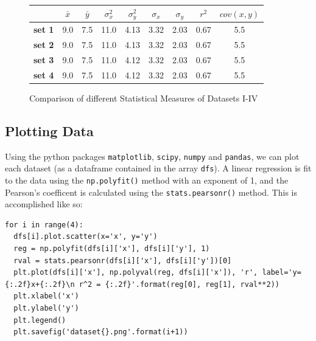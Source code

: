 \documentclass[11pt,a4paper]{article}
\begin{document}
\begin{figure}[]
\centering
\begin{tabular}{l|c|c|c|c|c|c|c|c|}
\cline{2-9}
                                     & \textbf{$\bar{x}$} & \textbf{$\bar{y}$} & \textbf{$\sigma_x^2$} & \textbf{$\sigma_y^2$} & \textbf{$\sigma_x$} & \textbf{$\sigma_y$} & \textbf{$r^2$} & \textbf{$cov(x, y)$} \\ \hline
\multicolumn{1}{|l|}{\textbf{set 1}} & 9.0                & 7.5              & 11.0                & 4.13                & 3.32                  & 2.03                  & 0.67           & 5.5                  \\ \hline
\multicolumn{1}{|l|}{\textbf{set 2}} & 9.0                & 7.5              & 11.0                & 4.13                & 3.32                  & 2.03                  & 0.67           & 5.5                  \\ \hline
\multicolumn{1}{|l|}{\textbf{set 3}} & 9.0                & 7.5              & 11.0                & 4.12                & 3.32                  & 2.03                  & 0.67           & 5.5                  \\ \hline
\multicolumn{1}{|l|}{\textbf{set 4}} & 9.0                & 7.5              & 11.0                & 4.12                & 3.32                  & 2.03                  & 0.67           & 5.5                  \\ \hline
\end{tabular}
\caption{Comparison of different Statistical Measures of Datasets I-IV}
\end{figure}

\subsection{Plotting Data}

Using the python packages \texttt{matplotlib}, \texttt{scipy}, \texttt{numpy} and \texttt{pandas}, we can plot each dataset (as a dataframe contained in the array \texttt{dfs}). A linear regression is fit to the data using the \texttt{np.polyfit()} method with an exponent of 1, and the Pearson's coefficent is calculated using the \texttt{stats.pearsonr()} method. This is accomplished like so:

\begin{lstlisting}
for i in range(4):
  dfs[i].plot.scatter(x='x', y='y') 
  reg = np.polyfit(dfs[i]['x'], dfs[i]['y'], 1)
  rval = stats.pearsonr(dfs[i]['x'], dfs[i]['y'])[0]
  plt.plot(dfs[i]['x'], np.polyval(reg, dfs[i]['x']), 'r', label='y={:.2f}x+{:.2f}\n r^2 = {:.2f}'.format(reg[0], reg[1], rval**2))
  plt.xlabel('x')
  plt.ylabel('y')
  plt.legend()
  plt.savefig('dataset{}.png'.format(i+1))
\end{lstlisting}
\end{document}
